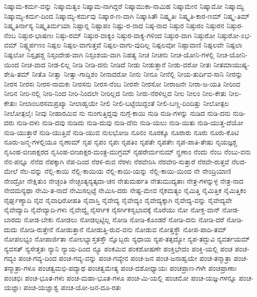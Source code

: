 {ನಿಷ್ಕಾಮ-ಕರ್ಮ-ವನ್ನು
ನಿಷ್ಕಾಮತ್ವಂ
ನಿಷ್ಕಾಮ-ನಾಗಿದ್ದರೆ
ನಿಷ್ಕಾಮುಕಾ-ನಾಮಿಹ
ನಿಷ್ಕಾಮೇನ
ನಿಷ್ಕಾಮೋ
ನಿಷ್ಕಾಮ್ಯ
ನಿಷ್ಕಾಮ್ಯ-ಕರ್ಮ-ದಿಂದ
ನಿಷ್ಕಾಮ್ಯ-ಕರ್ಮವು
ನಿಷ್ಕಾರ-ಣ-ವಾಗಿ
ನಿಷ್ಕಾಸಿತೌ
ನಿಷ್ಕೃತಿಃ
ನಿಷ್ಕೃತಿ-ಕಾರ-ಣಮ್
ನಿಷ್ಕೃ-ತಿಮ್
ನಿಷ್ಕೃತಿರ್ನಾಸ್ಯ
ನಿಷ್ಕೃತಿರ್ಮಯಾ
ನಿಷ್ಟಾನ್ನ
ನಿಷ್ಟಾಪಂ
ನಿಷ್ಟು-ರ-ನಾದ
ನಿಷ್ಠ-ನಾದ
ನಿಷ್ಠುರ
ನಿಷ್ಠುರಂ
ನಿಷ್ಠುರನ
ನಿಷ್ಠುರ-ನೆಂಬ
ನಿಷ್ಠುರ-ಭಾಷಣಃ
ನಿಷ್ಠು-ರಮ್
ನಿಷ್ಠುರ-ವಾಕ್ಯಂ
ನಿಷ್ಠುರ-ವಾಕ್ಯ-ಗಳಿಂದ
ನಿಷ್ಠುರ-ವಾಗಿ
ನಿಷ್ಠುರೋ
ನಿಷ್ಠುರೋ-ಽಭ-ವಮ್
ನಿಷ್ಣ್ವರ್ಪಣಂ
ನಿಷ್ಪಲ
ನಿಷ್ಪಲ-ವಾಗುತ್ತವೆ
ನಿಷ್ಪಲ-ವಾಗು-ವುದಿಲ್ಲ
ನಿಷ್ಪಲವೋ
ನಿಷ್ಪಾವಾಣಿ
ನಿಷ್ಫಲವೇ
ನಿಷ್ಫಲಾ
ನಿಷ್ಫಲೋ
ನಿಸ್ಪೃಹಶ್ಚ
ನಿಸ್ಸಂದೇಹ-ವಾಗಿ
ನಿಸ್ಸಂಶಯ-ವಾಗಿ
ನಿಹತ್ಯ
ನೀಚ
ನೀಚನು
ನೀಚ-ಯೋನಿ-ಗಳಲ್ಲಿ
ನೀಚ-ಯೋನಿ-ಯಿಂದ
ನೀಚ-ವಾದ
ನೀಡ-ಲಿಲ್ಲ
ನೀಡಿ
ನೀಡಿ-ದನು
ನೀಡಿದೆ
ನೀಡು
ನೀಡುತ್ತಾನೆ
ನೀಡು-ವರೋ
ನೀತಃ
ನೀತಮಾಯುಷ್ಯ-ಶೇಷಿ-ತಮ್
ನೀತೊ
ನೀತ್ವಾ
ನೀತ್ವಾ-ಗಾದ್ದಿಶಂ
ನೀನಾದರೋ
ನೀನು
ನೀನೂ
ನೀನೆಲ್ಲಿ
ನೀಯ-ತುರ್ದಿವ-ಸಾನಿ
ನೀರನ್ನು
ನೀರಸ
ನೀರಸಃ
ನೀರಸ-ನಾಮಕಃ
ನೀರಸನು
ನೀರಸ-ನೆಂಬ
ನೀರಸೇ
ನೀರಸೋ
ನೀರಾಜನೇ
ನೀರಾ-ಜ-ಯತಿ
ನೀರಿಂದ
ನೀರಿನ
ನೀರಿ-ನಲ್ಲಿ
ನೀರಿ-ನಿಂದ
ನೀರಿ-ನಿಂದಲೇ
ನೀರಿಲ್ಲದ
ನೀರು
ನೀರು-ನೆರಳಿಲ್ಲದ
ನೀಲ
ನೀಲಂ
ನೀಲ-ಕೇತು
ನೀಲ-ಕೇತುಃ
ನೀಲಾಂಬರಸಮಪ್ರಖ್ಯಾ
ನೀಲಾಹ್ವಯೇ
ನೀಲಿ
ನೀಲಿ-ಬಟ್ಟೆಯಿದ್ದಂತೆ
ನೀಲಿ-ಬಣ್ಣ-ದಿಂದಿತ್ತು
ನೀಲೋತ್ಪಲ
ನೀಲೋತ್ಪಲೈಃ
ನೀವು
ನೀಹಾರಮಿವ
ನು
ನುಂಗುತ್ತಿದ್ದವು
ನುಗ್ಗೆ-ಕಾಯಿ
ನುಡಿ
ನುಡಿ-ಗಳನ್ನು
ನುಡಿದ
ನುಡಿ-ದನು
ನುಡಿ-ದರು
ನುಡಿ-ದಳು
ನುಡಿ-ದವು
ನುಡಿದು
ನುಡಿ-ದುವು
ನುಡಿ-ದೆನು
ನುಡಿ-ಯಲು
ನುಡಿ-ಯಿತು
ನುಡಿ-ಯುತ್ತ-ದೆಯೋ
ನುಡಿ-ಯುತ್ತಾರೆ
ನುಡಿ-ಯುತ್ತಿವೆ
ನುಡಿ-ಯುವ
ನುಲಭೋಜ
ನೂನಂ
ನೂರಕ್ಕೂ
ನೂರಾರು
ನೂರು
ನೂರು-ಕೊಟಿ
ನೂರು-ಜನ್ಮ-ಗಳಲ್ಲಿಯೂ
ನೃಣಾಮ್
ನೃಪ
ನೃಪಂ
ನೃಪಃ
ನೃಪತಿಂ
ನೃಪತೇ
ನೃಪತೇಃ
ನೃಪ-ಪಾತಿ-ತೇಷು
ನೃಯಜ್ಞಶ್ಚ
ನೃಸಿಂಹ-ಬೀಜಾಕ್ಷರದ
ನೃಸಿಂಹ-ಬೀಜಾಕ್ಷರ-ಮಂತ್ರ-ಮುಗ್ರಮ್
ನೃಹರೇರ್ಮನುಮ್
ನೄಣಾಂ
ನೆಂದು
ನೆಂಬ
ನೆಂಬು-ವನು
ನೆನ-ಪನ್ನೂ
ನೆನೆದ
ನೆಪಕ್ಕಾಗಿ
ನೆಪ-ದಿಂದ
ನೆರಳಿ-ರುವ
ನೆರಳು
ನೆರವೇರಿಸಿ
ನೆರವೇರಿ-ಸುತ್ತಾರೆ
ನೆರವೇ-ರುತ್ತವೆ
ನೆಲದ-ಮೇಲೆ
ನೆಲ-ವನ್ನು
ನೆಲ್ಲಿ-ಕಾಯಿ
ನೆಲ್ಲಿ-ಕಾಯಿಯ
ನೆಲ್ಲಿ-ಕಾಯಿ-ಯನ್ನು
ನೆಲ್ಲಿ-ಕಾಯಿ-ಯಿಂದ
ನೇ
ನೇಂದ್ರಿಯಾಣಿ
ನೇಂದ್ರೋ
ನೇಕ್ಷಿತುಂ
ನೇಚ್ಛಂತಿ
ನೇಚ್ಛಂತ್ಯನ್ಯತ್ಕದಾ-ಚನ
ನೇತುಮರ್ಹತಿ
ನೇತುಮುದ್ಯತಾಃ
ನೇತ್ರ-ಗಳನ್ನುಳ್ಳ
ನೇತ್ರ-ನಾದ
ನೇದಮನ್ಯಥಾ
ನೇಮಿ-ತ-ನಾದೆ
ನೇಮಿಸಲ್ಪಟ್ಟೆ
ನೇಮಿಸಿ-ದರು
ನೇಷ್ಟ-ಮೇವ
ನೈಕಮತ್ಯಂ
ನೈಮಿತ್ತಿ
ನೈಮಿತ್ತಿಕ
ನೈಮಿತ್ತಿಕಂ
ನೈರ್ಘೃಣ್ಯಾದಿ
ನೈವ
ನೈವಾಧಿರೋಹತಿ
ನೈವಾಸ್ತಿ
ನೈವೇದ್ಯ
ನೈವೇದ್ಯಂ
ನೈವೇದ್ಯಕ್ಕಾಗಿ
ನೈವೇದ್ಯ-ವನ್ನು
ನೈವೇದ್ಯವೇ
ನೈವೇದ್ಯಾದಿ
ನೈವೇದ್ಯಾದಿ-ಗಳು
ನೈವೇದ್ಯೈ
ನೈಸರ್ಗಿಕ
ನೈಸರ್ಗಿಕಸ್ವಭಾವಕ್ಕೆ
ನೊರೆಯು
ನೋ
ನೋಕ್ತ-ವಾನ್
ನೋಡ-ಬಾರದು
ನೋಡ-ಬೇಕು
ನೋಡಲು
ನೋಡಲ್ಪಟ್ಟಿಲ್ಲ
ನೋಡಿ
ನೋಡಿ-ಕೊಂಡರೆ
ನೋಡಿ-ದನು
ನೋಡಿ-ದರೆ
ನೋಡಿ-ದುದು
ನೋಡಿ-ರುತ್ತೇನೆ
ನೋಡುತ್ತಾನೆ
ನೋಡುತ್ತಿ-ರುವ-ವನು
ನೋಡುವ
ನೋತ್ತಸ್ಥೌ
ನೋಪ-ಪಾದಿ-ತಮ್
ನೋಪಲಭ್ಯಂ
ನೋಪಾರ್ಜಿತಾ
ನೋಲಭ್ಯಾಸ್ತತಸ್ತೌ
ನ್ನೊಬ್ಬರು
ನ್ಯಧಾಯ
ನ್ಯಪ-ತತ್ಸದ್ಯೋ
ನ್ಯಪ-ತದ್ಭುವಿ
ನ್ಯವರ್ತಯಮ್
ನ್ಯವಸತ್
ನ್ಯಸೇತ್ತತಃ
ನ್ಯಾನಿ
ನ್ಯಾಯ-ದಿಂದ
ನ್ಯೂ
ಪಂಕಮಿವ
ಪಂಕಶೋಷಣೇ
ಪಂಕ್ತಿಭೇದಂ
ಪಂಕ್ತಿ-ಯಲ್ಲಿ
ಪಂಚ
ಪಂಚ-ಗವ್ಯಂ
ಪಂಚ-ಗವ್ಯ-ದಿಂದ
ಪಂಚ-ಗವ್ಯ-ವನ್ನು
ಪಂಚ-ಗವ್ಯೇನ
ಪಂಚ-ಜನ
ಪಂಚ-ಜನಾಹ್ವಯೇ
ಪಂಚ-ತನ್ಮಾತ್ರಾ
ಪಂಚ-ತನ್ಮಾತ್ರಾ-ಗಳೂ
ಪಂಚತ್ವಮಭಿ-ಪದ್ಯಾಥ
ಪಂಚತ್ವಮೇತ್ಯ
ಪಂಚ-ದಶೋಧ್ಯಾಯಃ
ಪಂಚಪ್ರಾಣ-ಗಳೇ
ಪಂಚಪ್ರಾಣಾಃ
ಪಂಚಭಿಃ
ಪಂಚ-ಭೂತ-ಗಳು
ಪಂಚ-ಮಹಾ-ಭೂತ-ಗಳೂ
ಪಂಚ-ಮಿ-ಯಲ್ಲಿ
ಪಂಚಮೋ
ಪಂಚ-ಯಜ್ಞ-ಗಳನ್ನೂ
ಪಂಚ-ಯಜ್ಞಾಃ
ಪಂಚ-ಯಜ್ಞಾಶ್ವ
ಪಂಚ-ಯೋ-ಜನ-ದೂ-ರತಃ
}
